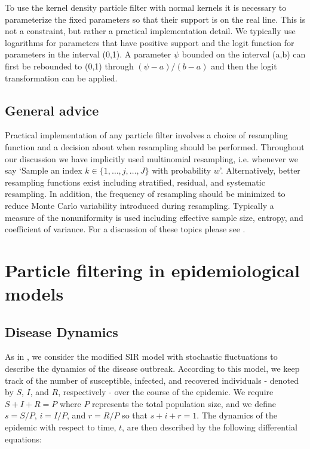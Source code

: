 \documentclass{elsarticle}
\begin{document}
To use the kernel density particle filter with normal kernels it is necessary to parameterize the fixed parameters so that their support is on the real line. This is not a constraint, but rather a practical implementation detail. We typically use logarithms for parameters that have positive support and the logit function for parameters in the interval (0,1). A parameter $\psi$ bounded on the interval (a,b) can first be rebounded to (0,1) through $(\psi-a)/(b-a)$ and then the logit transformation can be applied.

\subsection{General advice}

Practical implementation of any particle filter involves a choice of resampling function and a decision about when resampling should be performed. Throughout our discussion we have implicitly used multinomial resampling, i.e. whenever we say `Sample an index $k\in\{1,\ldots,j,\ldots,J\}$ with probability $w$'. Alternatively, better resampling functions exist including stratified, residual, and systematic resampling. In addition, the frequency of resampling should be minimized to reduce Monte Carlo variability introduced during resampling. Typically a measure of the nonuniformity is used including effective sample size, entropy, and coefficient of variance. For a discussion of these topics please see \cite{Douc:Capp:Moul:comp:2005}.

\section{Particle filtering in epidemiological models \label{sec:apply}}

\subsection{Disease Dynamics}

As in \citet{skvortsov2012monitoring}, we consider the modified SIR model with stochastic fluctuations to describe the dynamics of the disease outbreak.  According to this model, we keep track of the number of susceptible, infected, and recovered individuals - denoted by $S$, $I$, and $R$, respectively - over the course of the epidemic.  We require $S + I + R = P$ where $P$ represents the total population size, and we define $s = S/P$, $i = I/P$, and $r = R/P$ so that $s + i + r = 1$.  The dynamics of the epidemic with respect to time, $t$, are then described by the following differential equations:
\end{document}
